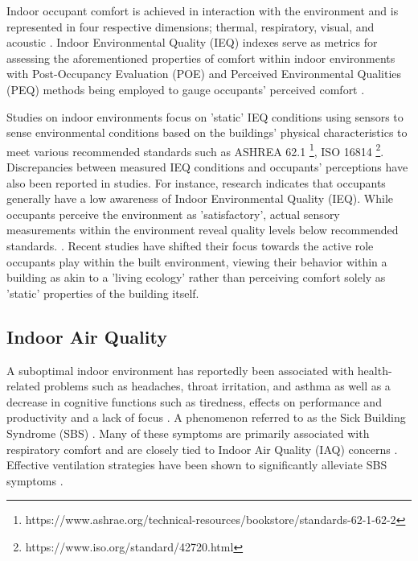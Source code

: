 Indoor occupant comfort is achieved in interaction with the environment and is represented in four respective dimensions; thermal, respiratory, visual, and acoustic \cite{alavi_comfort_2017}. Indoor Environmental Quality (IEQ) \cite{kulshreshtha_indoor_2024} indexes serve as metrics for assessing the aforementioned properties of comfort within indoor environments with Post-Occupancy Evaluation (POE) \cite{elsayed_post-occupancy_2023} and Perceived Environmental Qualities (PEQ) \cite{son_perceived_2023} methods being employed to gauge occupants' perceived comfort \cite{boissonneault_concepts_2023}. 

Studies on indoor environments focus on 'static' IEQ conditions using sensors to sense environmental conditions based on the buildings' physical characteristics to meet various recommended standards such as ASHREA 62.1 \footnote{https://www.ashrae.org/technical-resources/bookstore/standards-62-1-62-2}, ISO 16814 \footnote{https://www.iso.org/standard/42720.html}. Discrepancies between measured IEQ conditions and occupants' perceptions have also been reported in studies. For instance, research indicates that occupants generally have a low awareness of Indoor Environmental Quality (IEQ). While occupants perceive the environment as 'satisfactory', actual sensory measurements within the environment reveal quality levels below recommended standards. \cite{son_perceived_2023}. Recent studies have shifted their focus towards the active role occupants play within the built environment, viewing their behavior within a building as akin to a 'living ecology' \cite{langevin_quantifying_2016} rather than perceiving comfort solely as 'static' properties of the building itself. 


\subsection{Indoor Air Quality}

A suboptimal indoor environment has reportedly been associated with health-related problems such as headaches, throat irritation, and asthma \cite{klepeis_national_2001} as well as a decrease in cognitive functions such as tiredness, effects on performance and productivity and a lack of focus \cite{wang_how_2021} \cite{du_indoor_2020}. A phenomenon referred to as the Sick Building Syndrome (SBS) \cite{gawande_indoor_2020, passarelli_sick_2009}. Many of these symptoms are primarily associated with respiratory comfort and are closely tied to Indoor Air Quality (IAQ) concerns \cite{kim_analyzing_2019}. Effective ventilation strategies have been shown to significantly alleviate SBS symptoms \cite{gawande_indoor_2020}.

